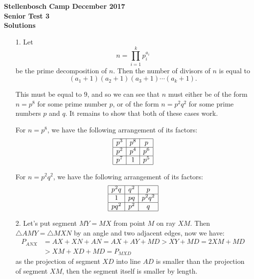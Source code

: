 \documentclass[a4paper, 12pt]{article}
\begin{document}
\begin{center}
\textbf{Stellenbosch Camp December 2017 \\ Senior Test 3} \\
\textbf{Solutions}
\end{center}

\begin{enumerate}

    \item[1.] Let
    \[
        n = \prod_{i=1}^{k} p_i^{a_i}
    \]
    be the prime decomposition of $n$. Then the number of divisors of $n$ is
    equal to
    \[
        (a_1 + 1)(a_2 + 1)(a_3 + 1) \cdots (a_k + 1).
    \]

    This must be equal to $9$, and so we can see that $n$ must either be of the
    form $n = p^8$ for some prime number $p$, or of the form $n = p^2 q^2$ for
    some prime numbers $p$ and $q$. It remains to show that both of these cases
    work.

    For $n = p^8$, we have the following arrangement of its factors:
    \[
        \begin{array}{|c|c|c|}
            \hline
            p^3 & p^8 & p \\
            \hline
            p^2 & p^4 & p^6 \\
            \hline
            p^7 & 1 & p^5 \\
            \hline
        \end{array}
    \]

    For $n = p^2 q^2$, we have the following arrangement of its factors:
    \[
        \begin{array}{|c|c|c|}
            \hline
            p^2 q & q^2 & p \\
            \hline
            1 & p q & p^2 q^2 \\
            \hline
            pq^2 & p^2 & q \\
            \hline
        \end{array}
    \]
    
    
    \item[2.] Let's put segment $MY = MX$ from point $M$ on ray $XM$. Then $\triangle AMY = \triangle MXN$ by an angle and two adjacent edges, now we have:
    \begin{align*}
        P_{ANX} &= AX + XN + AN = AX + AY + MD > XY + MD = 2XM + MD \\
        &> XM + XD + MD = P_{MXD}
    \end{align*}
    as the projection of segment $XD$ into line $AD$ is smaller than the projection of segment $XM$, then the segment itself is smaller by length.
    

\end{enumerate}
\end{document}
